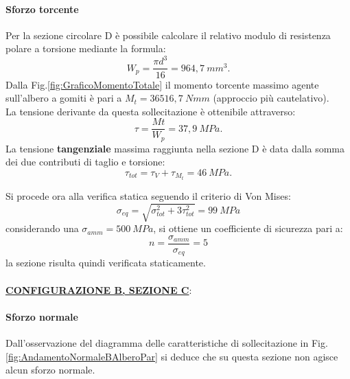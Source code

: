 \paragraph{Sforzo torcente}Per la sezione circolare D è possibile calcolare il relativo modulo di resistenza polare a torsione mediante la formula:
\begin{equation}
    W_p=\frac{\pi d^3}{16}=964,7\ mm^3.
\end{equation}
Dalla Fig.\ref{fig:GraficoMomentoTotale} il momento torcente massimo agente sull'albero a gomiti è pari a $M_t=36516,7\ Nmm$ (approccio più cautelativo).\\
La tensione derivante da questa sollecitazione è ottenibile attraverso:
\begin{equation}
    \tau=\frac{Mt}{W_p}=37,9\ MPa.
\end{equation}
 La tensione \textbf{tangenziale} massima raggiunta nella sezione D è data dalla somma dei due contributi di taglio e torsione:
\begin{equation}
    \tau_{tot}=\tau_{V}+\tau_{M_t}=46\ MPa.
\end{equation}

Si procede ora alla verifica statica seguendo il criterio di Von Mises:
\begin{equation}
    \sigma_{eq}=\sqrt{\sigma_{tot}^2+3\tau_{tot}^2}=99\ MPa
\end{equation}
considerando una $\sigma_{amm}=500\ MPa$, si ottiene un coefficiente di sicurezza pari a:
\begin{equation}
    n=\frac{\sigma_{amm}}{\sigma_{eq}}=5
\end{equation}
la sezione risulta quindi verificata staticamente.\\
\\
\underline{\textbf{CONFIGURAZIONE B, SEZIONE C}}:
\paragraph{Sforzo normale} Dall'osservazione del diagramma delle caratteristiche di sollecitazione in Fig.\ref{fig:AndamentoNormaleBAlberoPar} si deduce che su questa sezione non agisce alcun sforzo normale.
